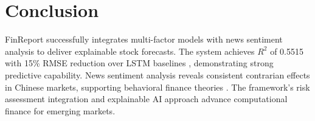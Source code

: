 \documentclass[3p,times,procedia]{elsarticle}
\begin{document}
\section{Conclusion}

FinReport successfully integrates multi-factor models \cite{FAMA1993,Carhart1997} with news sentiment analysis \cite{TETLOCK2007,Araci2019} to deliver explainable stock forecasts. The system achieves $R^2$ of 0.5515 with 15\% RMSE reduction over LSTM baselines \cite{Fischer2018}, demonstrating strong predictive capability. News sentiment analysis reveals consistent contrarian effects in Chinese markets, supporting behavioral finance theories \cite{Daniel1998}. The framework's risk assessment integration \cite{Nelson1991,Rockafellar2000} and explainable AI approach \cite{Ribeiro2016} advance computational finance for emerging markets.

\FloatBarrier
\vspace*{-3pt} 






\end{document}
